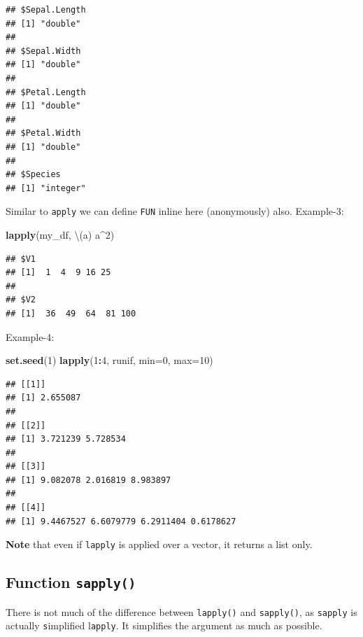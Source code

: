 \documentclass[
]{book}
\newenvironment{Shaded}{\begin{snugshade}}{\end{snugshade}}
\newcommand{\AttributeTok}[1]{\textcolor[rgb]{0.13,0.29,0.53}{#1}}
\newcommand{\DecValTok}[1]{\textcolor[rgb]{0.00,0.00,0.81}{#1}}
\newcommand{\FunctionTok}[1]{\textcolor[rgb]{0.13,0.29,0.53}{\textbf{#1}}}
\newcommand{\NormalTok}[1]{#1}
\newcommand{\SpecialCharTok}[1]{\textcolor[rgb]{0.81,0.36,0.00}{\textbf{#1}}}
\begin{document}
\begin{verbatim}
## $Sepal.Length
## [1] "double"
## 
## $Sepal.Width
## [1] "double"
## 
## $Petal.Length
## [1] "double"
## 
## $Petal.Width
## [1] "double"
## 
## $Species
## [1] "integer"
\end{verbatim}

Similar to \texttt{apply} we can define \texttt{FUN} inline here (anonymously) also. Example-3:

\begin{Shaded}
\begin{Highlighting}[]
\FunctionTok{lapply}\NormalTok{(my\_df, \textbackslash{}(a) a}\SpecialCharTok{\^{}}\DecValTok{2}\NormalTok{) }
\end{Highlighting}
\end{Shaded}

\begin{verbatim}
## $V1
## [1]  1  4  9 16 25
## 
## $V2
## [1]  36  49  64  81 100
\end{verbatim}

Example-4:

\begin{Shaded}
\begin{Highlighting}[]
\FunctionTok{set.seed}\NormalTok{(}\DecValTok{1}\NormalTok{)}
\FunctionTok{lapply}\NormalTok{(}\DecValTok{1}\SpecialCharTok{:}\DecValTok{4}\NormalTok{, runif, }\AttributeTok{min=}\DecValTok{0}\NormalTok{, }\AttributeTok{max=}\DecValTok{10}\NormalTok{)}
\end{Highlighting}
\end{Shaded}

\begin{verbatim}
## [[1]]
## [1] 2.655087
## 
## [[2]]
## [1] 3.721239 5.728534
## 
## [[3]]
## [1] 9.082078 2.016819 8.983897
## 
## [[4]]
## [1] 9.4467527 6.6079779 6.2911404 0.6178627
\end{verbatim}

\textbf{Note} that even if \texttt{lapply} is applied over a vector, it returns a list only.

\hypertarget{function-sapply}{%
\subsection{\texorpdfstring{Function \texttt{sapply()}}{Function sapply()}}\label{function-sapply}}

There is not much of the difference between \texttt{lapply()} and \texttt{sapply()}, as \texttt{sapply} is actually \texttt{s}implified l\texttt{apply}. It simplifies the argument as much as possible.
\end{document}

